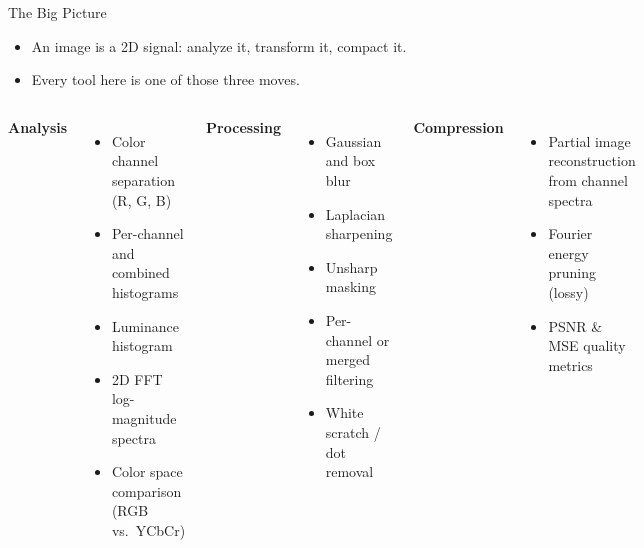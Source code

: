 \documentclass[aspectratio=169]{beamer}
\begin{document}
\begin{frame}{The Big Picture}
  \begin{itemize}
    \item An image is a 2D signal: analyze it, transform it, compact it.
    \item Every tool here is one of those three moves.
  \end{itemize}
  \vspace{0.3cm}
  \begin{columns}[t]
      \textbf{\small Analysis}
      \begin{itemize}\setlength\itemsep{5pt}
        \item[\scriptsize\textbullet] Color channel separation (R, G, B)
        \item[\scriptsize\textbullet] Per-channel and combined histograms
        \item[\scriptsize\textbullet] Luminance histogram
        \item[\scriptsize\textbullet] 2D FFT log-magnitude spectra
        \item[\scriptsize\textbullet] Color space comparison (RGB vs.\ YCbCr)
      \end{itemize}
      \textbf{\small Processing}
      \begin{itemize}\setlength\itemsep{5pt}
        \item[\scriptsize\textbullet] Gaussian and box blur
        \item[\scriptsize\textbullet] Laplacian sharpening
        \item[\scriptsize\textbullet] Unsharp masking
        \item[\scriptsize\textbullet] Per-channel or merged filtering
        \item[\scriptsize\textbullet] White scratch / dot removal
      \end{itemize}
      \textbf{\small Compression}
      \begin{itemize}\setlength\itemsep{5pt}
        \item[\scriptsize\textbullet] Partial image reconstruction from channel spectra
        \item[\scriptsize\textbullet] Fourier energy pruning (lossy)
        \item[\scriptsize\textbullet] PSNR \& MSE quality metrics
      \end{itemize}
  \end{columns}
\end{frame}
\end{document}
